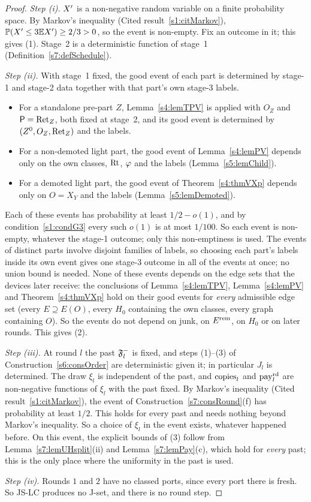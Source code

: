 \begin{proof}
\emph{Step (i).} $X'$ is a non-negative random variable on a finite probability
space. By Markov's inequality (Cited result~\ref{s1:citMarkov}),
$\mathbb{P}(X'\le3\mathbb{E}X')\ge2/3>0$, so the event is non-empty. Fix an outcome in it;
this gives (1). Stage~2 is a deterministic function of stage~1
(Definition~\ref{s7:defSchedule}).

\emph{Step (ii).} With stage~1 fixed, the good event of each part is determined
by stage-1 and stage-2 data together with that part's own stage-3 labels.
\begin{itemize}
\item For a standalone pre-part $Z$, Lemma~\ref{s4:lemTPV} is applied with $O_Z$
and $\mathsf{P}=\mathrm{Ret}_Z$, both fixed at stage~2, and its good event is determined by
$(Z^0,O_Z,\mathrm{Ret}_Z)$ and the labels.
\item For a non-demoted light part, the good event of Lemma~\ref{s4:lemPV}
depends only on the own classes, $\mathrm{Rt}$, $\varphi$ and the labels
(Lemma~\ref{s5:lemChild}).
\item For a demoted light part, the good event of Theorem~\ref{s4:thmVXp}
depends only on $O=X_Y$ and the labels (Lemma~\ref{s5:lemDemoted}).
\end{itemize}
Each of these events has probability at least $1/2-o(1)$, and by
condition~\ref{s1:condG3} every such $o(1)$ is at most $1/100$. So each event
is non-empty, whatever the stage-1 outcome; only this non-emptiness is used. The events of distinct parts involve disjoint families of labels,
so choosing each part's labels inside its own event gives one stage-3 outcome in
all of the events at once; no union bound is needed. None of these events
depends on the edge sets that the devices later receive: the conclusions of
Lemma~\ref{s4:lemTPV}, Lemma~\ref{s4:lemPV} and Theorem~\ref{s4:thmVXp} hold on
their good events for \emph{every} admissible edge set (every $E\supseteq E(O)$,
every $H_0$ containing the own classes, every graph containing $O$). So the
events do not depend on junk, on $E^{\mathrm{rem}}$, on $H_0$ or on later rounds. This
gives (2).

\emph{Step (iii).} At round $l$ the past $\mathfrak{F}^{-}_l$ is fixed, and steps (1)--(3)
of Construction~\ref{s6:consOrder} are deterministic given it; in particular
$J_l$ is determined. The draw $\xi_l$ is independent of the past, and
$\mathrm{copies}_l$ and $\mathrm{pay}^{\mathrm{rd}}_l$ are non-negative functions of $\xi_l$ with the past
fixed. By Markov's inequality (Cited result~\ref{s1:citMarkov}), the event of
Construction~\ref{s7:consRound}(f) has probability at least $1/2$. This holds for
every past and needs nothing beyond Markov's inequality. So a choice of $\xi_l$
in the event exists, whatever happened before. On this event, the explicit
bounds of (3) follow from Lemma~\ref{s7:lemUHsplit}(ii) and
Lemma~\ref{s7:lemPay}(c), which hold for \emph{every} past; this is the only
place where the uniformity in the past is used.

\emph{Step (iv).} Rounds $1$ and $2$ have no classed ports, since every port
there is fresh. So JS-LC produces no J-set, and there is no round step.
\end{proof}

